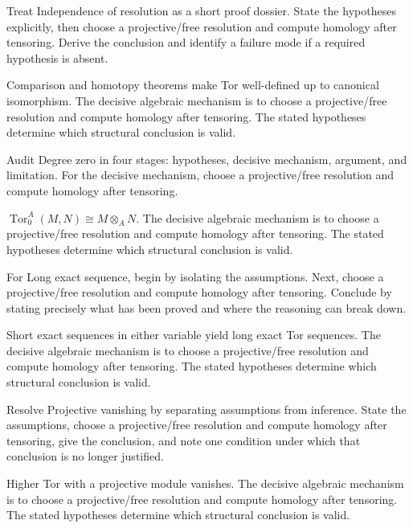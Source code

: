 \begin{problem}\label{prob:v26-problem-02}
Treat Independence of resolution as a short proof dossier. State the hypotheses explicitly, then choose a projective/free resolution and compute homology after tensoring. Derive the conclusion and identify a failure mode if a required hypothesis is absent.
\end{problem}
\begin{solution}
Comparison and homotopy theorems make Tor well-defined up to canonical isomorphism. The decisive algebraic mechanism is to choose a projective/free resolution and compute homology after tensoring. The stated hypotheses determine which structural conclusion is valid.
\end{solution}

\begin{problem}\label{prob:v26-problem-03}
Audit Degree zero in four stages: hypotheses, decisive mechanism, argument, and limitation. For the decisive mechanism, choose a projective/free resolution and compute homology after tensoring.
\end{problem}
\begin{solution}
$\operatorname{Tor}_0^A(M,N)\cong M\otimes_A N$. The decisive algebraic mechanism is to choose a projective/free resolution and compute homology after tensoring. The stated hypotheses determine which structural conclusion is valid.
\end{solution}

\begin{problem}\label{prob:v26-problem-04}
For Long exact sequence, begin by isolating the assumptions. Next, choose a projective/free resolution and compute homology after tensoring. Conclude by stating precisely what has been proved and where the reasoning can break down.
\end{problem}
\begin{solution}
Short exact sequences in either variable yield long exact Tor sequences. The decisive algebraic mechanism is to choose a projective/free resolution and compute homology after tensoring. The stated hypotheses determine which structural conclusion is valid.
\end{solution}

\begin{problem}\label{prob:v26-problem-05}
Resolve Projective vanishing by separating assumptions from inference. State the assumptions, choose a projective/free resolution and compute homology after tensoring, give the conclusion, and note one condition under which that conclusion is no longer justified.
\end{problem}
\begin{solution}
Higher Tor with a projective module vanishes. The decisive algebraic mechanism is to choose a projective/free resolution and compute homology after tensoring. The stated hypotheses determine which structural conclusion is valid.
\end{solution}

